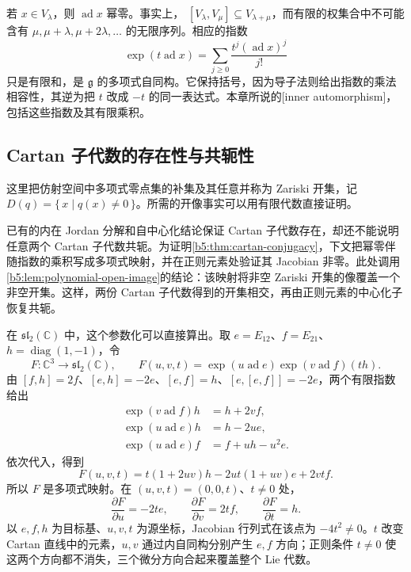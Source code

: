 \ProseParagraphBreak

若 \(x\in V_\lambda\)，则 \(\operatorname{ad}x\) 幂零。事实上， \([V_\lambda,V_\mu]\subseteq V_{\lambda+\mu}\)，而有限的权集合中不可能含有 \(\mu,\mu+\lambda,\mu+2\lambda,\ldots\) 的无限序列。相应的指数
\[
	\exp(t\operatorname{ad}x) =\sum_{j\geq0}\frac{t^j(\operatorname{ad}x)^j}{j!}
\]
只是有限和，是 \(\mathfrak g\) 的多项式自同构。它保持括号，因为导子法则给出指数的乘法相容性，其逆为把 \(t\) 改成 \(-t\) 的同一表达式。本章所说的[inner automorphism]，包括这些指数及其有限乘积。

\subsection{Cartan 子代数的存在性与共轭性}
\label{b5:subsec:1601:03}

这里把仿射空间中多项式零点集的补集及其任意并称为 Zariski 开集，记 \(D(q)=\bigl\{\,x\mid q(x)\ne0\,\bigr\}\)。所需的开像事实可以用有限代数直接证明。

\ProseParagraphBreak

已有的内在 Jordan 分解和自中心化结论保证 Cartan 子代数存在，却还不能说明任意两个 Cartan 子代数共轭。为证明\cref{b5:thm:cartan-conjugacy}，下文把幂零伴随指数的乘积写成多项式映射，并在正则元素处验证其 Jacobian 非零。此处调用\cref{b5:lem:polynomial-open-image}的结论：该映射将非空 Zariski 开集的像覆盖一个非空开集。这样，两份 Cartan 子代数得到的开集相交，再由正则元素的中心化子恢复共轭。

\ProseParagraphBreak

在 \(\mathfrak{sl}_2(\mathbb C)\) 中，这个参数化可以直接算出。取 \(e=E_{12}\)、\(f=E_{21}\)、\(h=\operatorname{diag}(1,-1)\)，令
\[
	F:\mathbb C^3\longrightarrow\mathfrak{sl}_2(\mathbb C),\qquad F(u,v,t)=\exp(u\operatorname{ad}e)\exp(v\operatorname{ad}f)(th).
\]
由 \([f,h]=2f\)、\([e,h]=-2e\)、\([e,f]=h\)、\([e,[e,f]]=-2e\)，两个有限指数给出
\[
	\begin{aligned}
		\exp(v\operatorname{ad}f)h&=h+2vf,\\
		\exp(u\operatorname{ad}e)h&=h-2ue,\\
		\exp(u\operatorname{ad}e)f&=f+uh-u^2e.
	\end{aligned}
\]
依次代入，得到
\[
	F(u,v,t)=t(1+2uv)h-2ut(1+uv)e+2vtf.
\]
所以 \(F\) 是多项式映射。在 \((u,v,t)=(0,0,t)\)、\(t\ne0\) 处，
\[
	\frac{\partial F}{\partial u}=-2te,\qquad \frac{\partial F}{\partial v}=2tf,\qquad \frac{\partial F}{\partial t}=h.
\]
以 \(e,f,h\) 为目标基、\(u,v,t\) 为源坐标，Jacobian 行列式在该点为 \(-4t^2\ne0\)。\(t\) 改变 Cartan 直线中的元素，\(u,v\) 通过内自同构分别产生 \(e,f\) 方向；正则条件 \(t\ne0\) 使这两个方向都不消失，三个微分方向合起来覆盖整个 Lie 代数。

